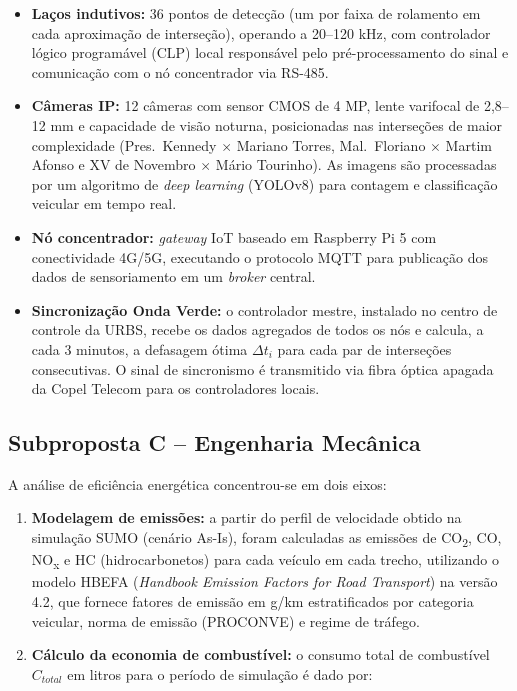 \documentclass[12pt,a4paper,oneside]{abntex2}
\begin{document}
\begin{itemize}
  \item \textbf{Laços indutivos:} 36 pontos de detecção (um por faixa de rolamento em cada aproximação de interseção), operando a 20--120 kHz, com controlador lógico programável (CLP) local responsável pelo pré-processamento do sinal e comunicação com o nó concentrador via RS-485.
  \item \textbf{Câmeras IP:} 12 câmeras com sensor CMOS de 4 MP, lente varifocal de 2,8--12 mm e capacidade de visão noturna, posicionadas nas interseções de maior complexidade (Pres.~Kennedy $\times$ Mariano Torres, Mal.~Floriano $\times$ Martim Afonso e XV de Novembro $\times$ Mário Tourinho). As imagens são processadas por um algoritmo de \textit{deep learning} (YOLOv8) para contagem e classificação veicular em tempo real.
  \item \textbf{Nó concentrador:} \textit{gateway} IoT baseado em Raspberry Pi 5 com conectividade 4G/5G, executando o protocolo MQTT para publicação dos dados de sensoriamento em um \textit{broker} central.
  \item \textbf{Sincronização Onda Verde:} o controlador mestre, instalado no centro de controle da URBS, recebe os dados agregados de todos os nós e calcula, a cada 3 minutos, a defasagem ótima $\Delta t_i$ para cada par de interseções consecutivas. O sinal de sincronismo é transmitido via fibra óptica apagada da Copel Telecom para os controladores locais.
\end{itemize}

\subsection{Subproposta C -- Engenharia Mecânica}

A análise de eficiência energética concentrou-se em dois eixos:

\begin{enumerate}[label=\textbf{E\arabic*:},leftmargin=1.5cm]
  \item \textbf{Modelagem de emissões:} a partir do perfil de velocidade obtido na simulação SUMO (cenário As-Is), foram calculadas as emissões de CO\textsubscript{2}, CO, NO\textsubscript{x} e HC (hidrocarbonetos) para cada veículo em cada trecho, utilizando o modelo HBEFA (\textit{Handbook Emission Factors for Road Transport}) na versão 4.2, que fornece fatores de emissão em g/km estratificados por categoria veicular, norma de emissão (PROCONVE) e regime de tráfego.
  \item \textbf{Cálculo da economia de combustível:} o consumo total de combustível $C_{total}$ em litros para o período de simulação é dado por:
\end{enumerate}
\end{document}
